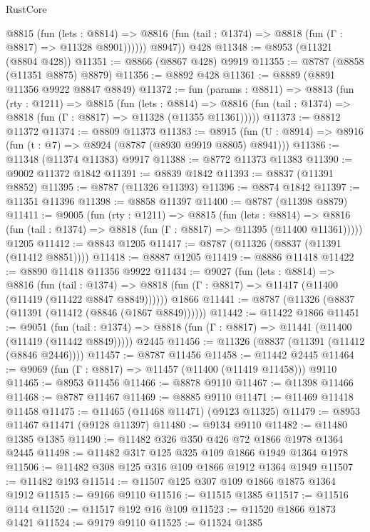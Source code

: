 \begin{lexlean}{RustCore}
\begin{coremodule}
            @8815
              (fun (lets : @8814) =>
              @8816 (fun (tail : @1374) => @8818 (fun (Γ : @8817) => @11328 @8901))))))
        @8947))
    @428
@11348 := @8953 (@11321 (@8804 @428))
@11351 := @8866 (@8867 @428) @9919
@11355 := @8787 (@8858 (@11351 @8875) @8879)
@11356 := @8892 @428
@11361 := @8889 (@8891 @11356 @9922 @8847 @8849)
@11372 := fun (params : @8811) =>
  @8813
    (fun (rty : @1211) =>
    @8815
      (fun (lets : @8814) =>
      @8816 (fun (tail : @1374) => @8818 (fun (Γ : @8817) => @11328 (@11355 @11361)))))
@11373 := @8812 @11372
@11374 := @8809 @11373
@11383 := @8915 (fun (U : @8914) => @8916 (fun (t : @7) => @8924 (@8787 (@8930 @9919 @8805) @8941)))
@11386 := @11348 (@11374 @11383) @9917
@11388 := @8772 @11373 @11383
@11390 := @9002 @11372 @1842
@11391 := @8839 @1842
@11393 := @8837 (@11391 @8852)
@11395 := @8787 (@11326 @11393)
@11396 := @8874 @1842
@11397 := @11351 @11396
@11398 := @8858 @11397
@11400 := @8787 (@11398 @8879)
@11411 := @9005
    (fun (rty : @1211) =>
    @8815
      (fun (lets : @8814) =>
      @8816 (fun (tail : @1374) => @8818 (fun (Γ : @8817) => @11395 (@11400 @11361)))))
    @1205
@11412 := @8843 @1205
@11417 := @8787 (@11326 (@8837 (@11391 (@11412 @8851))))
@11418 := @8887 @1205
@11419 := @8886 @11418
@11422 := @8890 @11418 @11356 @9922
@11434 := @9027
    (fun (lets : @8814) =>
    @8816
      (fun (tail : @1374) =>
      @8818 (fun (Γ : @8817) => @11417 (@11400 (@11419 (@11422 @8847 @8849))))))
    @1866
@11441 := @8787 (@11326 (@8837 (@11391 (@11412 (@8846 (@1867 @8849))))))
@11442 := @11422 @1866
@11451 := @9051
    (fun (tail : @1374) => @8818 (fun (Γ : @8817) => @11441 (@11400 (@11419 (@11442 @8849)))))
    @2445
@11456 := @11326 (@8837 (@11391 (@11412 (@8846 @2446))))
@11457 := @8787 @11456
@11458 := @11442 @2445
@11464 := @9069 (fun (Γ : @8817) => @11457 (@11400 (@11419 @11458))) @9110
@11465 := @8953 @11456
@11466 := @8878 @9110
@11467 := @11398 @11466
@11468 := @8787 @11467
@11469 := @8885 @9110
@11471 := @11469 @11418 @11458
@11475 := @11465 (@11468 @11471) (@9123 @11325)
@11479 := @8953 @11467 @11471 (@9128 @11397)
@11480 := @9134 @9110
@11482 := @11480 @1385 @1385
@11490 := @11482 @326 @350 @426 @72 @1866 @1978 @1364 @2445
@11498 := @11482 @317 @125 @325 @109 @1866 @1949 @1364 @1978
@11506 := @11482 @308 @125 @316 @109 @1866 @1912 @1364 @1949
@11507 := @11482 @193
@11514 := @11507 @125 @307 @109 @1866 @1875 @1364 @1912
@11515 := @9166 @9110
@11516 := @11515 @1385
@11517 := @11516 @114
@11520 := @11517 @192 @16 @109
@11523 := @11520 @1866 @1873 @1421
@11524 := @9179 @9110
@11525 := @11524 @1385

\end{coremodule}
\end{lexlean}
